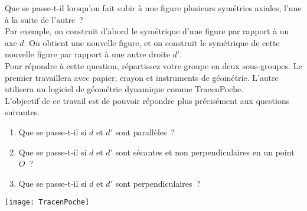 
\begin{TP}

Que se passe‑t‑il lorsqu'on fait subir à une figure plusieurs symétries axiales, l'une à la suite de l'autre ? \\[0.5em]
Par exemple, on construit d'abord le symétrique d'une figure par rapport à un axe $d$. On obtient une nouvelle figure, et on construit le symétrique de cette nouvelle figure par rapport à une autre droite $d'$. \\[0.5em]
Pour répondre à cette question, répartissez votre groupe en deux sous‑groupes. Le premier travaillera avec papier, crayon et instruments de géométrie. L'autre utilisera un logiciel de géométrie dynamique comme TracenPoche. \\[0.5em]
L'objectif de ce travail est de pouvoir répondre plus précisément aux questions suivantes.
\begin{enumerate}
 \item Que se passe‑t‑il si $d$ et $d'$ sont parallèles ?
 \item Que se passe‑t‑il si $d$ et $d'$ sont sécantes et non perpendiculaires en un point $O$ ?
 \item Que se passe‑t‑il si $d$ et $d'$ sont perpendiculaires ?
 \end{enumerate}
\begin{center} \texttt{[image: TracenPoche]} \end{center}
\end{TP}


